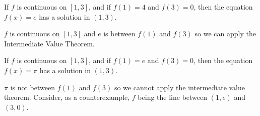 \documentclass{ximera}
\begin{document}
\begin{exercise}
\begin{exercise}
\begin{exercise}
\begin{exercise}
If $f$ is continuous on $\left[1,3\right]$, and if $f(1) = 4$ and $f(3) = 0$, then the equation $f(x) = e$ has a solution in $\left(1,3\right)$.

\begin{multipleChoice}
\end{multipleChoice}

\begin{feedback}
$f$ is continuous on $\left[1,3\right]$ and $e$ is between $f(1)$ and $f(3)$ so we can apply the Intermediate Value Theorem.
\end{feedback}

\begin{exercise}

If $f$ is continuous on $\left[1,3\right]$, and if $f(1) = e$ and $f(3) = 0$, then the equation $f(x) = \pi$ has a solution in $\left(1,3\right)$.

\begin{multipleChoice}
\end{multipleChoice}

\begin{feedback}
$\pi$ is not between $f(1)$ and $f(3)$ so we cannot apply the intermediate value theorem.  Consider, as a counterexample, $f$ being the line between $(1,e)$ and $(3,0)$.
\end{feedback}

\end{exercise}
\end{exercise}
\end{exercise}
\end{exercise}
\end{exercise}
\end{document}
